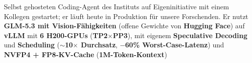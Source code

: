 {\begin{experiences}
{\begin{itemize}
{            \ifcvshowagent
            \item Selbst gehosteten Coding-Agent des Instituts auf Eigeninitiative mit einem Kollegen gestartet; er läuft heute in Produktion für unsere Forschenden. Er nutzt \textbf{GLM-5.3 mit Vision-Fähigkeiten}\ifcvshowstackdetail{} (offene Gewichte von \textbf{Hugging Face})\fi{} auf \textbf{vLLM} mit \textbf{6 H200-GPUs}\ifcvshowservingdetail{} (\textbf{TP2$\times$PP3})\fi, mit eigenem \textbf{Speculative Decoding} und \textbf{Scheduling} (\textbf{$\sim$10$\times$ Durchsatz}\ifcvshowservingdetail, \textbf{$-$60\% Worst-Case-Latenz}\fi) und \textbf{NVFP4 + FP8-KV-Cache} (\textbf{1M-Token-Kontext})
            \fi}

\end{itemize}}
\end{experiences}}
